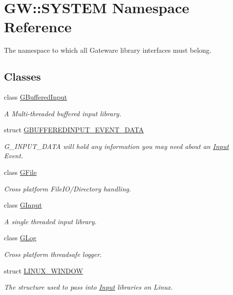 \hypertarget{namespaceGW_1_1SYSTEM}{}\section{GW\+:\+:S\+Y\+S\+T\+EM Namespace Reference}
\label{namespaceGW_1_1SYSTEM}


The namespace to which all Gateware library interfaces must belong.  


\subsection*{Classes}
\begin{DoxyCompactItemize}
\item 
class \hyperlink{classGW_1_1SYSTEM_1_1GBufferedInput}{G\+Buffered\+Input}
\begin{DoxyCompactList}\small\item\em A Multi-\/threaded buffered input library. \end{DoxyCompactList}\item 
struct \hyperlink{structGW_1_1SYSTEM_1_1GBUFFEREDINPUT__EVENT__DATA}{G\+B\+U\+F\+F\+E\+R\+E\+D\+I\+N\+P\+U\+T\+\_\+\+E\+V\+E\+N\+T\+\_\+\+D\+A\+TA}
\begin{DoxyCompactList}\small\item\em G\+\_\+\+I\+N\+P\+U\+T\+\_\+\+D\+A\+TA will hold any information you may need about an \hyperlink{classInput}{Input} Event. \end{DoxyCompactList}\item 
class \hyperlink{classGW_1_1SYSTEM_1_1GFile}{G\+File}
\begin{DoxyCompactList}\small\item\em Cross platform File\+I\+O/\+Directory handling. \end{DoxyCompactList}\item 
class \hyperlink{classGW_1_1SYSTEM_1_1GInput}{G\+Input}
\begin{DoxyCompactList}\small\item\em A single threaded input library. \end{DoxyCompactList}\item 
class \hyperlink{classGW_1_1SYSTEM_1_1GLog}{G\+Log}
\begin{DoxyCompactList}\small\item\em Cross platform threadsafe logger. \end{DoxyCompactList}\item 
struct \hyperlink{structGW_1_1SYSTEM_1_1LINUX__WINDOW}{L\+I\+N\+U\+X\+\_\+\+W\+I\+N\+D\+OW}
\begin{DoxyCompactList}\small\item\em The structure used to pass into \hyperlink{classInput}{Input} libraries on Linux. \end{DoxyCompactList}\end{DoxyCompactItemize}
